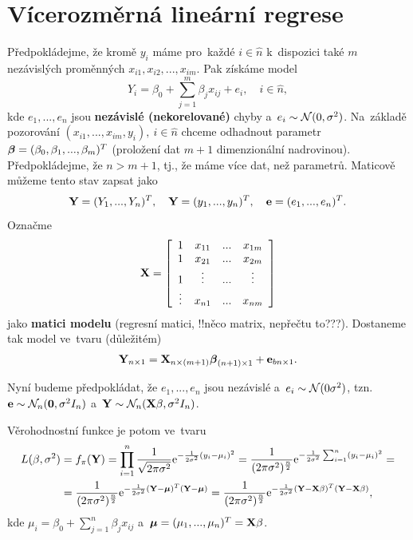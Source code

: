 \chapter{Vícerozměrná lineární regrese}

Předpokládejme, že kromě $y_i$ máme pro~každé $i\in\widehat{n}$ k~dispozici také $m$ nezávislých proměnných $x_{i1},x_{i2},...,x_{im}$. Pak získáme model
 $$ Y_i = \beta_0+\sum_{j = 1}^m \beta_j x_{ij}+e_i,\quad i\in\widehat{n}, $$
kde $e_1,...,e_n$ jsou \textbf{nezávislé (nekorelované)} chyby a~$e_i\sim\mathcal{N}(0,\sigma^2)$. Na~základě pozorování $(x_{i1},...,x_{im},y_i),~i\in\widehat{n}$ chceme odhadnout parametr $\boldsymbol{\beta} = (\beta_0,\beta_1,...,\beta_m)^T$ (proložení dat $m+1$ dimenzionální nadrovinou). Předpokládejme, že $n>m+1$, tj., že máme více dat, než parametrů. Maticově můžeme tento stav zapsat jako
 $$ \textbf{Y} = (Y_1,...,Y_n)^T,\quad \textbf{Y} = (y_1,...,y_n)^T,\quad \textbf{e} = (e_1,...,e_n)^T. $$
Označme
 $$ \textbf{X} = \left[\begin{array}{cccc}
1 & x_{11} &... & x_{1m} \\
1 & x_{21} &... & x_{2m} \\
1 & \vdots &... & \vdots \\
 \vdots& x_{n1} &... & x_{nm}
\end{array}
 \right] $$ jako \textbf{matici modelu} (regresní matici, !!něco matrix, nepřečtu to???). Dostaneme tak model ve~tvaru (důležitém)
  \begin{equation}\label{the_chosen_one}
 \textbf{Y}_{n\times 1} = \textbf{X}_{n\times(m+1)}\boldsymbol{\beta}_{(n+1)\times 1}+\textbf{e}_{bn\times 1}.
 \end{equation}

 Nyní budeme předpokládat, že $e_1,...,e_n$ jsou nezávislé a~$e_i \sim\mathcal{N}(0\sigma^2)$, tzn. $\textbf{e}\sim\mathcal{N}_n(\textbf{0},\sigma^2 I_n)$ a~$\textbf{Y}\sim\mathcal{N}_n(\textbf{X}\beta,\sigma^2 I_n)$.

 Věrohodnostní funkce je potom ve~tvaru
 \begin{align*}
 L(\beta,\sigma^2)& = f_\pi(\textbf{Y}) = \prod_{i = 1}^n \frac{1}{\sqrt{2\pi\sigma^2}}\mathrm{e}^{-\frac{1}{2\sigma^2}(y_i-\mu_i)^2} = \frac{1}{(2\pi\sigma^2)^{\frac{n}{2}}}\mathrm{e}^{-\frac{1}{2\sigma^2}\sum_{i = 1}^n (y_i-\mu_i)^2} = \\ & = \frac{1}{(2\pi\sigma^2)^{\frac{n}{2}}}\mathrm{e}^{-\frac{1}{2\sigma^2}(\textbf{Y}-\boldsymbol{\mu})^T(\textbf{Y}-\boldsymbol{\mu})} = \frac{1}{(2\pi\sigma^2)^{\frac{n}{2}}}\mathrm{e}^{-\frac{1}{2\sigma^2}(\textbf{Y}-\textbf{X}\beta)^T(\textbf{Y}-\textbf{X}\beta)},
 \end{align*}
kde $\mu_i = \beta_0+\sum_{j = 1}^n \beta_j x_{ij}$ a~$\boldsymbol{\mu} = (\mu_1,...,\mu_n)^T = \textbf{X}\beta$.

